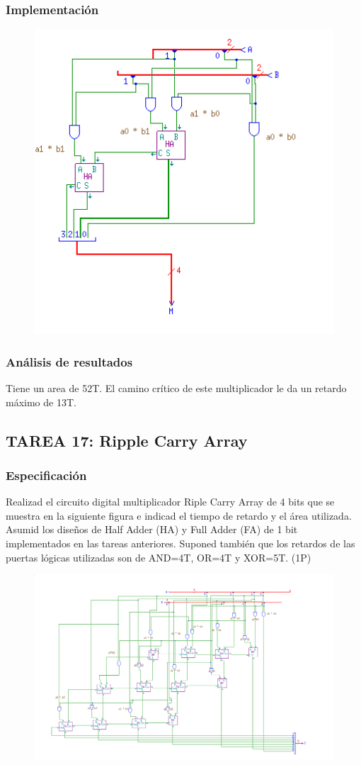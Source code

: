\documentclass{article}
\begin{document}
		\subsubsection*{Implementación}
		 \begin{figure}[ht]
		 	\includegraphics[width=0.8\linewidth]{RCA2}
		 	\centering
		 \end{figure}

		\subsubsection*{Análisis de resultados}
		Tiene un area de 52T. El camino crítico de este multiplicador le da un retardo máximo de 13T.
	\subsection{TAREA 17: Ripple Carry Array}
		\subsubsection*{Especificación}
		Realizad el circuito digital multiplicador Riple Carry Array de 4 bits que se muestra en
		la siguiente figura e indicad el tiempo de retardo y el área utilizada. Asumid los diseños de Half
		Adder (HA) y Full Adder (FA) de 1 bit implementados en las tareas anteriores. Suponed también
		que los retardos de las puertas lógicas utilizadas son de AND=4T, OR=4T y XOR=5T. (1P)

		\begin{figure}[ht]
			\includegraphics[width=0.8\linewidth]{RCA4}
			\centering
		\end{figure}
\end{document}
